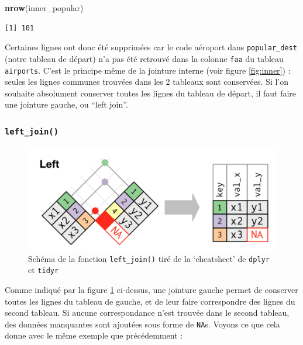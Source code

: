 \documentclass[a4paperpaper,]{article}
\newenvironment{Shaded}{\begin{snugshade}}{\end{snugshade}}
\newcommand{\DataTypeTok}[1]{\textcolor[rgb]{0.00,0.34,0.68}{#1}}
\newcommand{\KeywordTok}[1]{\textcolor[rgb]{0.12,0.11,0.11}{\textbf{#1}}}
\newcommand{\NormalTok}[1]{\textcolor[rgb]{0.12,0.11,0.11}{#1}}
\newcommand{\OperatorTok}[1]{\textcolor[rgb]{0.12,0.11,0.11}{#1}}
\newcommand{\StringTok}[1]{\textcolor[rgb]{0.75,0.01,0.01}{#1}}
\theoremstyle{definition}
\theoremstyle{definition}
\theoremstyle{definition}
\theoremstyle{remark}
\begin{document}
\begin{Shaded}
\begin{Highlighting}[]
\KeywordTok{nrow}\NormalTok{(inner_popular)}
\end{Highlighting}
\end{Shaded}

\begin{verbatim}
[1] 101
\end{verbatim}

Certaines lignes ont donc été supprimées car le code aéroport dans
\texttt{popular\_dest} (notre tableau de départ) n'a pas été retrouvé
dans la colonne \texttt{faa} du tableau \texttt{airports}. C'est le
principe même de la jointure interne (voir figure \ref{fig:inner}) :
seules les lignes communes trouvées dans les 2 tableaux sont conservées.
Si l'on souhaite absolument conserver toutes les lignes du tableau de
départ, il faut faire une jointure gauche, ou ``left join''.

\hypertarget{left_join}{%
\subsubsection{\texorpdfstring{\texttt{left\_join()}}{left\_join()}}\label{left_join}}

\begin{figure}[htpb]

{\centering \includegraphics[width=0.5\linewidth]{images/leftjoin} 

}

\caption{Schéma de la fonction \texttt{left\_join()} tiré de la
`cheatsheet' de \texttt{dplyr} et \texttt{tidyr}}\label{fig:left}
\end{figure}




Comme indiqué par la figure \ref{fig:left} ci-dessus, une jointure
gauche permet de conserver toutes les lignes du tableau de gauche, et de
leur faire correspondre des lignes du second tableau. Si aucune
correspondance n'est trouvée dans le second tableau, des données
manquantes sont ajoutées sous forme de \texttt{NA}s. Voyons ce que cela
donne avec le même exemple que précédemment :

\begin{Shaded}
\end{Shaded}
\end{document}
